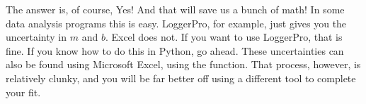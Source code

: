 The answer is, of course, Yes! And that will save us a bunch of math! In
some data analysis programs this is easy. LoggerPro, for example, just gives
you the uncertainty in $m$ and $b.$ Excel does not. If you want to use
LoggerPro, that is fine. If you know how to do this in Python, go ahead.
These uncertainties can also be found using Microsoft Excel, using the
 function. That process, however, is relatively clunky, and you
will be far better off using a different tool to complete your fit.




